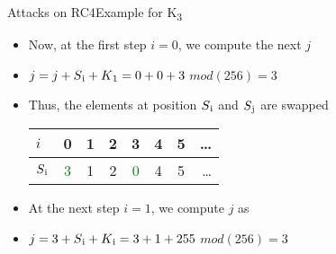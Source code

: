 \documentclass[
	aspectratio=169,	%
	onlytextwidth,		%
	t,					%
	]{beamer}
\begin{document}
\begin{frame}[fragile]{Attacks on RC4}{Example for K\textsubscript{3}}
	\begin{itemize}
		\item Now, at the first step $i=0$, we compute the next $j$
		\item $j = j + S\textsubscript{i} + K\textsubscript{1} = 0 + 0 + 3$ $mod(256) = 3$
		\item Thus, the elements at position $S\textsubscript{i}$ and $S\textsubscript{j}$ are swapped
		\medskip
		\begin{table}[h!]
			\begin{center}
			  \label{tab:table2}
			  \begin{tabular}{l|c|c|c|c|c|c|r}
				$i$ & 0 & 1 & 2 & 3 & 4 & 5 & \dots\\
				\hline
				$S\textsubscript{i}$ & \textcolor{green}{3} & 1 & 2 & \textcolor{green}{0} & 4 & 5 & \dots\\
			  \end{tabular}
			\end{center}
		  \end{table}
		\item At the next step $i = 1$, we compute $j$ as
		\item $j = 3 + S\textsubscript{i} + K\textsubscript{i} = 3 + 1 + 255$ $mod(256) = 3$
	\end{itemize}
\end{frame}
\end{document}
